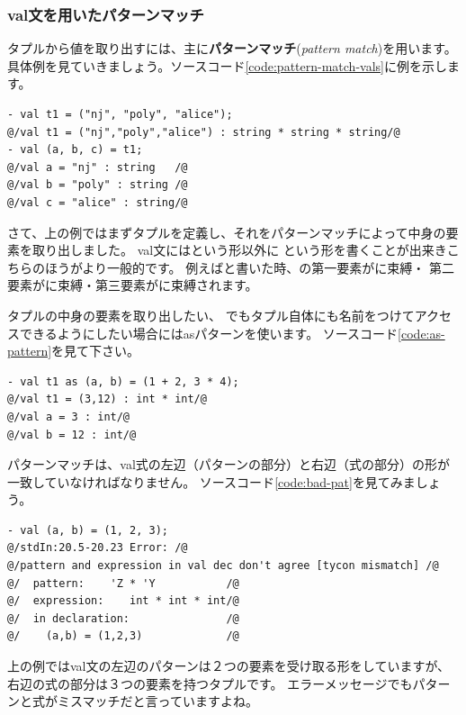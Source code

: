 \documentclass[11pt,a4paper]{jarticle}
\begin{document}
\subsubsection{val文を用いたパターンマッチ}

タプルから値を取り出すには、主に{\bfseries パターンマッチ}({\itshape pattern match})を用います。
具体例を見ていきましょう。ソースコード\ref{code:pattern-match-vals}に例を示します。

\begin{lstlisting}[caption=val文でパターンマッチ,label=code:pattern-match-vals]
- val t1 = ("nj", "poly", "alice");
@/val t1 = ("nj","poly","alice") : string * string * string/@
- val (a, b, c) = t1;
@/val a = "nj" : string   /@
@/val b = "poly" : string /@
@/val c = "alice" : string/@
\end{lstlisting}

さて、上の例ではまずタプルを定義し、それをパターンマッチによって中身の要素を取り出しました。
val文にはという形以外に
という形を書くことが出来きこちらのほうがより一般的です。
例えばと書いた時、の第一要素がに束縛・
第二要素がに束縛・第三要素がに束縛されます。

タプルの中身の要素を取り出したい、
でもタプル自体にも名前をつけてアクセスできるようにしたい場合にはasパターンを使います。
ソースコード\ref{code:as-pattern}を見て下さい。

\begin{lstlisting}[caption=asパターン,label=code:as-pattern]
- val t1 as (a, b) = (1 + 2, 3 * 4);
@/val t1 = (3,12) : int * int/@
@/val a = 3 : int/@
@/val b = 12 : int/@
\end{lstlisting}

パターンマッチは、val式の左辺（パターンの部分）と右辺（式の部分）の形が一致していなければなりません。
ソースコード\ref{code:bad-pat}を見てみましょう。
\begin{lstlisting}[caption=型が合わないパターンマッチ,label=code:bad-pat]
- val (a, b) = (1, 2, 3);
@/stdIn:20.5-20.23 Error: /@
@/pattern and expression in val dec don't agree [tycon mismatch] /@
@/  pattern:    'Z * 'Y           /@
@/  expression:    int * int * int/@
@/  in declaration:               /@
@/    (a,b) = (1,2,3)             /@
\end{lstlisting}

上の例ではval文の左辺のパターンは２つの要素を受け取る形をしていますが、
右辺の式の部分は３つの要素を持つタプルです。
エラーメッセージでもパターンと式がミスマッチだと言っていますよね。
\end{document}
